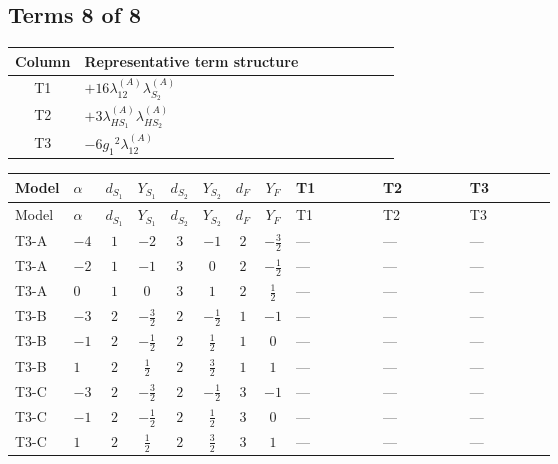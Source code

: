\documentclass[8pt]{article}
\begin{document}
\begin{landscape}
\subsection*{Terms 8 of 8}
\begin{center}
\begin{tabular}{@{}c >{\raggedright\arraybackslash}p{0.82\linewidth}@{}}
\toprule
Column & Representative term structure \\
\midrule
T1 & \(\displaystyle +16 {\lambda_{12}^{(A)}} {\lambda_{S_2}^{(A)}}\) \\
\midrule
T2 & \(\displaystyle +3 {\lambda_{HS_1}^{(A)}} {\lambda_{HS_2}^{(A)}}\) \\
\midrule
T3 & \(\displaystyle -6 {g_1}^2 {\lambda_{12}^{(A)}}\) \\
\midrule
\bottomrule
\end{tabular}
\end{center}
\smallskip
\tiny
\begin{longtable}{@{}llcccccc >{\raggedright\arraybackslash}p{0.21\linewidth} >{\raggedright\arraybackslash}p{0.21\linewidth} >{\raggedright\arraybackslash}p{0.21\linewidth}@{}}
\toprule
Model & $\alpha$ & $d_{S_1}$ & $Y_{S_1}$ & $d_{S_2}$ & $Y_{S_2}$ & $d_F$ & $Y_F$ & T1 & T2 & T3 \\
\midrule
\endfirsthead
\toprule
Model & $\alpha$ & $d_{S_1}$ & $Y_{S_1}$ & $d_{S_2}$ & $Y_{S_2}$ & $d_F$ & $Y_F$ & T1 & T2 & T3 \\
\midrule
\endhead
T3-A & $-4$ & $1$ & $-2$ & $3$ & $-1$ & $2$ & $-\frac{3}{2}$ & --- & --- & --- \\
\midrule
T3-A & $-2$ & $1$ & $-1$ & $3$ & $0$ & $2$ & $-\frac{1}{2}$ & --- & --- & --- \\
\midrule
T3-A & $0$ & $1$ & $0$ & $3$ & $1$ & $2$ & $\frac{1}{2}$ & --- & --- & --- \\
\midrule
T3-B & $-3$ & $2$ & $-\frac{3}{2}$ & $2$ & $-\frac{1}{2}$ & $1$ & $-1$ & --- & --- & --- \\
\midrule
T3-B & $-1$ & $2$ & $-\frac{1}{2}$ & $2$ & $\frac{1}{2}$ & $1$ & $0$ & --- & --- & --- \\
\midrule
T3-B & $1$ & $2$ & $\frac{1}{2}$ & $2$ & $\frac{3}{2}$ & $1$ & $1$ & --- & --- & --- \\
\midrule
T3-C & $-3$ & $2$ & $-\frac{3}{2}$ & $2$ & $-\frac{1}{2}$ & $3$ & $-1$ & --- & --- & --- \\
\midrule
T3-C & $-1$ & $2$ & $-\frac{1}{2}$ & $2$ & $\frac{1}{2}$ & $3$ & $0$ & --- & --- & --- \\
\midrule
T3-C & $1$ & $2$ & $\frac{1}{2}$ & $2$ & $\frac{3}{2}$ & $3$ & $1$ & --- & --- & --- \\

\end{longtable}
\end{landscape}
\end{document}
